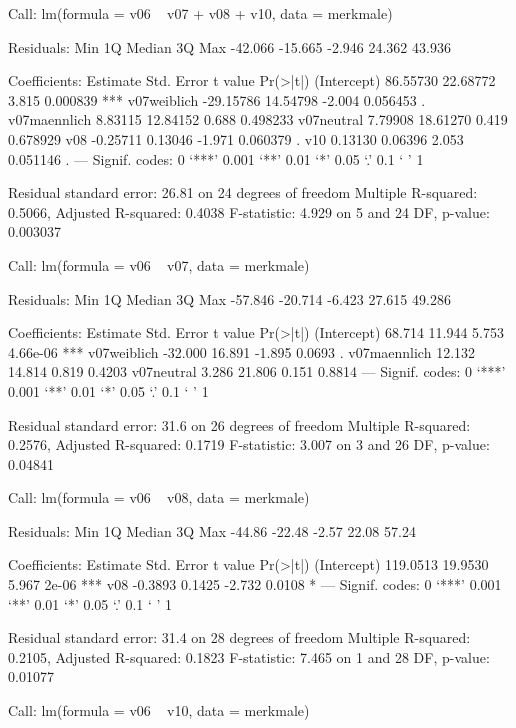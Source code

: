 \begin{Schunk}
\begin{Soutput}
Call:
lm(formula = v06 ~ v07 + v08 + v10, data = merkmale)

Residuals:
    Min      1Q  Median      3Q     Max 
-42.066 -15.665  -2.946  24.362  43.936 

Coefficients:
              Estimate Std. Error t value Pr(>|t|)    
(Intercept)   86.55730   22.68772   3.815 0.000839 ***
v07weiblich  -29.15786   14.54798  -2.004 0.056453 .  
v07maennlich   8.83115   12.84152   0.688 0.498233    
v07neutral     7.79908   18.61270   0.419 0.678929    
v08           -0.25711    0.13046  -1.971 0.060379 .  
v10            0.13130    0.06396   2.053 0.051146 .  
---
Signif. codes:  0 ‘***’ 0.001 ‘**’ 0.01 ‘*’ 0.05 ‘.’ 0.1 ‘ ’ 1 

Residual standard error: 26.81 on 24 degrees of freedom
Multiple R-squared: 0.5066,	Adjusted R-squared: 0.4038 
F-statistic: 4.929 on 5 and 24 DF,  p-value: 0.003037 
\end{Soutput}
\begin{Soutput}
Call:
lm(formula = v06 ~ v07, data = merkmale)

Residuals:
    Min      1Q  Median      3Q     Max 
-57.846 -20.714  -6.423  27.615  49.286 

Coefficients:
             Estimate Std. Error t value Pr(>|t|)    
(Intercept)    68.714     11.944   5.753 4.66e-06 ***
v07weiblich   -32.000     16.891  -1.895   0.0693 .  
v07maennlich   12.132     14.814   0.819   0.4203    
v07neutral      3.286     21.806   0.151   0.8814    
---
Signif. codes:  0 ‘***’ 0.001 ‘**’ 0.01 ‘*’ 0.05 ‘.’ 0.1 ‘ ’ 1 

Residual standard error: 31.6 on 26 degrees of freedom
Multiple R-squared: 0.2576,	Adjusted R-squared: 0.1719 
F-statistic: 3.007 on 3 and 26 DF,  p-value: 0.04841 
\end{Soutput}
\begin{Soutput}
Call:
lm(formula = v06 ~ v08, data = merkmale)

Residuals:
   Min     1Q Median     3Q    Max 
-44.86 -22.48  -2.57  22.08  57.24 

Coefficients:
            Estimate Std. Error t value Pr(>|t|)    
(Intercept) 119.0513    19.9530   5.967    2e-06 ***
v08          -0.3893     0.1425  -2.732   0.0108 *  
---
Signif. codes:  0 ‘***’ 0.001 ‘**’ 0.01 ‘*’ 0.05 ‘.’ 0.1 ‘ ’ 1 

Residual standard error: 31.4 on 28 degrees of freedom
Multiple R-squared: 0.2105,	Adjusted R-squared: 0.1823 
F-statistic: 7.465 on 1 and 28 DF,  p-value: 0.01077 
\end{Soutput}
\begin{Soutput}
Call:
lm(formula = v06 ~ v10, data = merkmale)


\end{Soutput}
\end{Schunk}
